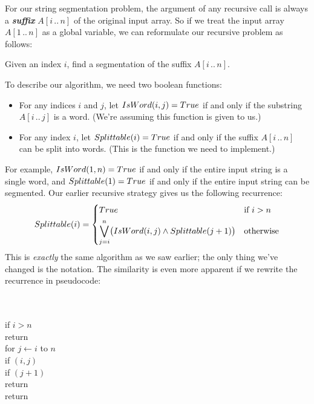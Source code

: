For our string segmentation problem, the argument of any recursive call is always a \textbf{\textit{suffix}} $A[i\,..\,n]$ of the original input array.
So if we treat the input array $A[1\,..\,n]$ as a global variable, we can reformulate our recursive problem as follows:
\begin{problembox}
Given an index $i$, find a segmentation of the suffix $A[i\,..\,n]$.
\end{problembox}
To describe our algorithm, we need two boolean functions:
\begin{itemize}
\item For any indices $i$ and $j$, let $IsWord(i, j) = True$ if and only if the substring $A[i\,..\,j]$ is a word.
(We’re assuming this function is given to us.)
\item For any index $i$, let $Splittable(i) = True$ if and only if the suffix $A[i\,..\,n]$ can be split into words.
(This is the function we need to implement.)
\end{itemize}
For example, $IsWord(1, n) = True$ if and only if the entire input string is a single word, and $Splittable(1) = True$ if and only if the entire input string can be segmented.
Our earlier recursive strategy gives us the following recurrence:
\[
Splittable(i) = \begin{cases}
True & \text{if } i > n\\[1ex]
\displaystyle\bigvee_{j=i}^{n} \bigl(IsWord(i, j) \wedge Splittable(j+1)\bigr) & \text{otherwise}
\end{cases}
\]
This is \textit{exactly} the same algorithm as we saw earlier; the only thing we’ve changed is the notation.
The similarity is even more apparent if we rewrite the recurrence in pseudocode:

\begin{pseudocode}
\\
\\
if $i > n$\\
\Indent return \\
for $j \gets i$ to $n$\\
\Indent if $(i, j)$\\
\Indent\Indent if $(j+1)$\\
\Indent\Indent\Indent return \\
return 
\end{pseudocode}

